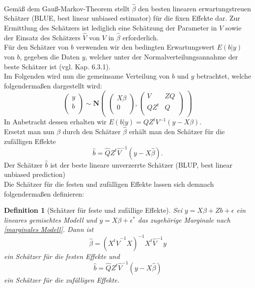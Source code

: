 \documentclass[%
thesis=student,%
coverpage=false,%
titlepage=false,%
headmarks=true, %
german,%
font=libertine, %
math=newpxtx, %
BCOR=5mm,%
coverBCOR=11mm%
]{tumbook}
\theoremstyle{break}
\newtheorem{definition}{Definition}[section]
\begin{document}
\\
Gemäß dem Gauß-Markov-Theorem stellt $\hat{\beta}$ den besten linearen erwartungstreuen Schätzer (BLUE, best linear unbiased estimator) für die fixen Effekte dar. Zur Ermittlung des Schätzers ist lediglich eine Schätzung der Parameter in $V$ sowie der Einsatz des Schätzers $\hat{V} $ von $V$ in $\hat{\beta}$ erforderlich. \\
Für den Schätzer von $b$ verwenden wir den bedingten Erwartungswert $E(b|y)$ von $b$, gegeben die Daten $y$, welcher unter der Normalverteilungsannahme der beste Schätzer ist (vgl. \cite{fahrmeir-2011-regression} Kap. 6.3.1). \\
Im Folgenden wird nun die gemeinsame Verteilung von $b$ und $y$ betrachtet, welche folgendermaßen dargestellt wird:
$$\begin{pmatrix}
	y \\
	b \\
\end{pmatrix}
\sim
\mathbf{N}
\begin{pmatrix}
	\begin{pmatrix}
		X\beta \\
		0 \\
	\end{pmatrix},
	\begin{pmatrix}
		V & Z Q \\
		Q Z^t & Q \\
	\end{pmatrix}
\end{pmatrix}$$
In Anbetracht dessen erhalten wir $E(b|y) = Q Z^tV^{-1}(y-X\beta)$. \\
Ersetzt man nun $\beta$ durch den Schätzer $\hat{\beta}$ erhält man den Schätzer für die zufälligen Effekte $$\hat{b} = \hat{Q} Z^t\hat{V}^{-1}(y-X\hat{\beta}).$$ Der Schätzer $\hat{b}$ ist der beste lineare unverzerrte Schätzer (BLUP, best linear unbiased prediction)\\
Die Schätzer für die festen und zufälligen Effekte lassen sich demnach folgendermaßen definieren:
\begin{definition}[Schätzer für feste und zufällige Effekte]
	Sei $y = X\beta + Zb + \epsilon$ ein lineares gemischtes Modell und $y=X\beta + \epsilon^*$ das zugehörige Marginale nach \ref{marginales Modell}.
	Dann ist $$\hat{\beta} = (X^t \hat{V}^{-1}X)^{-1}X^t \hat{V}^{-1}y$$ ein Schätzer für die festen Effekte und $$ \hat{b} = \hat{Q} Z^t\hat{V}^{-1}(y-X\hat{\beta})$$ ein Schätzer für die zufälligen Effekte.
\end{definition}\noindent
\end{document}
